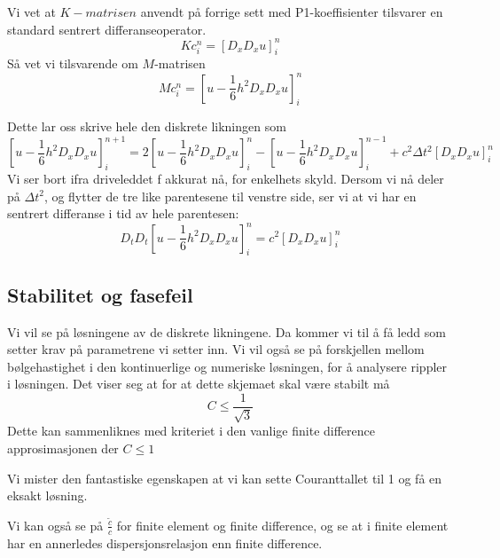 \documentclass[a4paper, 10pt]{article}
\begin{document}
Vi vet at $K-matrisen$ anvendt på forrige sett med P1-koeffisienter tilsvarer en standard sentrert differanseoperator.
\begin{equation}
Kc_i^n = [D_x D_x u]_i^n
\end{equation}
Så vet vi tilsvarende om $M$-matrisen
\begin{equation}
	Mc_i^n = [u-\frac{1}{6}h^2 D_x D_x u]_i^n
\end{equation}

Dette lar oss skrive hele den diskrete likningen som
\begin{equation}
	\left[u-\frac{1}{6} h^2 D_xD_x u\right]_i^{n+1} = 2\left[u-\frac{1}{6} h^2 D_xD_x u\right]_i^n - \left[u-\frac{1}{6} h^2 D_xD_x u\right]_i^{n-1} + c^2 \Delta t^2 \left[D_xD_xu\right]_i^n
\end{equation}
Vi ser bort ifra driveleddet f akkurat nå, for enkelhets skyld. Dersom vi nå deler på $\Delta t^2$, og flytter de tre like parentesene til venstre side, ser vi at vi har en sentrert differanse i tid av hele parentesen:
\begin{equation}
	D_tD_t\left[u-\frac{1}{6} h^2 D_xD_x u\right]_i^n = c^2[D_xD_xu]_i^n
\end{equation}

\subsection{Stabilitet og fasefeil}
Vi vil se på løsningene av de diskrete likningene. Da kommer vi til å få ledd som setter krav på parametrene vi setter inn. Vi vil også se på forskjellen mellom bølgehastighet i den kontinuerlige og numeriske løsningen, for å analysere rippler i løsningen. Det viser seg at for at dette skjemaet skal være stabilt må 
\begin{equation}
	C \leq \frac{1}{\sqrt{3}}
\end{equation}
Dette kan sammenliknes med kriteriet i den vanlige finite difference approsimasjonen der $C \leq 1$

Vi mister den fantastiske egenskapen at vi kan sette Couranttallet til 1 og få en eksakt løsning. 

Vi kan også se på $\frac{\tilde{c}}{c}$ for finite element og finite difference, og se at i finite element har en annerledes dispersjonsrelasjon enn finite difference. 
\end{document}
